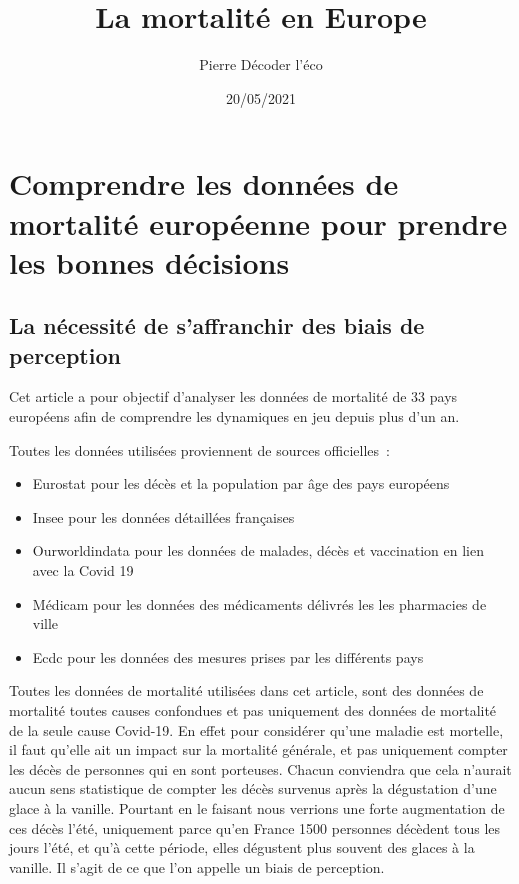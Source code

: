 \documentclass[
]{article}
\title{La mortalité en Europe}
\author{Pierre Décoder l'éco}
\date{20/05/2021}
\begin{document}
\maketitle

{
\setcounter{tocdepth}{2}
\tableofcontents
}
\hypertarget{comprendre-les-donnuxe9es-de-mortalituxe9-europuxe9enne-pour-prendre-les-bonnes-duxe9cisions}{%
\section{Comprendre les données de mortalité européenne pour prendre les
bonnes
décisions}\label{comprendre-les-donnuxe9es-de-mortalituxe9-europuxe9enne-pour-prendre-les-bonnes-duxe9cisions}}

\hypertarget{la-nuxe9cessituxe9-de-saffranchir-des-biais-de-perception}{%
\subsection{La nécessité de s'affranchir des biais de
perception}\label{la-nuxe9cessituxe9-de-saffranchir-des-biais-de-perception}}

Cet article a pour objectif d'analyser les données de mortalité de 33
pays européens afin de comprendre les dynamiques en jeu depuis plus d'un
an.

Toutes les données utilisées proviennent de sources officielles~:

\begin{itemize}
\item
  Eurostat pour les décès et la population par âge des pays européens
\item
  Insee pour les données détaillées françaises
\item
  Ourworldindata pour les données de malades, décès et vaccination en
  lien avec la Covid 19
\item
  Médicam pour les données des médicaments délivrés les les pharmacies
  de ville
\item
  Ecdc pour les données des mesures prises par les différents pays
\end{itemize}

Toutes les données de mortalité utilisées dans cet article, sont des
données de mortalité toutes causes confondues et pas uniquement des
données de mortalité de la seule cause Covid-19. En effet pour
considérer qu'une maladie est mortelle, il faut qu'elle ait un impact
sur la mortalité générale, et pas uniquement compter les décès de
personnes qui en sont porteuses. Chacun conviendra que cela n'aurait
aucun sens statistique de compter les décès survenus après la
dégustation d'une glace à la vanille. Pourtant en le faisant nous
verrions une forte augmentation de ces décès l'été, uniquement parce
qu'en France 1500 personnes décèdent tous les jours l'été, et qu'à cette
période, elles dégustent plus souvent des glaces à la vanille. Il s'agit
de ce que l'on appelle un biais de perception.
\end{document}
